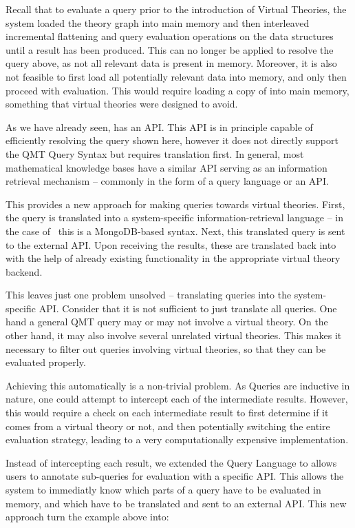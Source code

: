 Recall that to evaluate a query prior to the introduction of Virtual Theories, the \mmt system loaded the theory graph into main memory and then interleaved incremental flattening and query evaluation operations on the \mmt data structures until a result has been produced. 
This can no longer be applied to resolve the query above, as not all relevant data is present in memory. 
Moreover, it is also not feasible to first load all potentially relevant data into memory, and only then proceed with evaluation. 
This would require loading a copy of \lmfdb into main memory, something that virtual
theories were designed to avoid. 

As we have already seen, \lmfdb has an API. 
This API is in principle capable of efficiently resolving the query shown here, however it does not directly support the QMT Query Syntax but requires translation first. 
In general, most mathematical knowledge bases have a similar API serving as an information retrieval mechanism -- commonly in the form of a query language or an API. 

This provides a new approach for making queries towards virtual theories. 
First, the \mmt query is translated into a system-specific information-retrieval language -- in the case of \lmfdb\ this is a MongoDB-based syntax.
Next, this translated query is sent to the external API. 
Upon receiving the results, these are translated back into \ommt with the help of already existing functionality in the appropriate virtual theory backend.

This leaves just one problem unsolved -- translating queries into the system-specific API. 
Consider that it is not sufficient to just translate all queries. 
One hand a general QMT query may or may not involve a virtual theory. 
On the other hand, it may also involve several unrelated virtual theories. 
This makes it necessary to filter out queries involving virtual theories, so that they can be evaluated properly. 

Achieving this automatically is a non-trivial problem. 
As Queries are inductive in nature, one could attempt to intercept each of the intermediate results. 
However, this would require a check on each intermediate result to first determine if it comes from a virtual theory or not, and then potentially switching the entire evaluation strategy, leading to a very computationally expensive implementation. 

Instead of intercepting each result, we extended the Query Language to allows users to annotate sub-queries for evaluation with a specific API. 
This allows the system to immediatly know which parts of a query have to be evaluated in \mmt memory, and which have to be translated and sent to an external API. 
This new approach turn the example above into:


